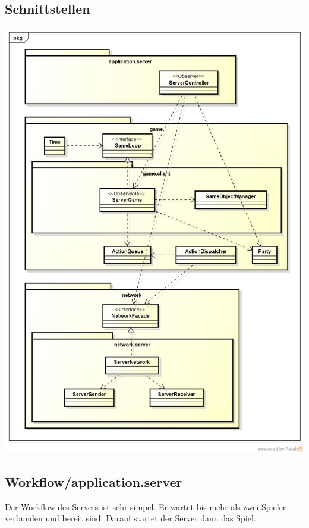 \documentclass[11pt]{scrartcl}
\begin{document}
\subsection{Schnittstellen}
\includegraphics[scale=0.48]{LogischeSichtServer}

\newpage
\subsection{Workflow/application.server}

Der Workflow des Servers ist sehr simpel. Er wartet bis mehr als zwei Spieler verbunden und bereit sind. Darauf startet der Server dann das Spiel.
\end{document}
